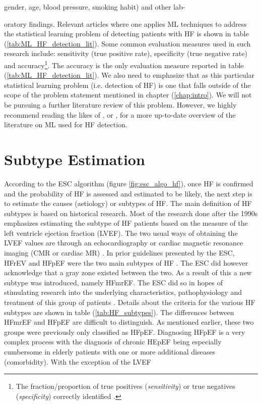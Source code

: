 \documentclass[../thesis.tex]{subfiles}
\begin{document}
gender, age, blood pressure, smoking habit) and other lab-



\noindent oratory findings. Relevant articles where one applies ML techniques to address the statistical learning problem of detecting patients with HF is shown in table (\ref{tab:ML_HF_detection_lit}). Some common evaluation measures used in such research include: sensitivity (true positive rate), specificity (true negative rate) and accuracy\footnote{The fraction/proportion of true positives (\textit{sensitivity}) or true negatives (\textit{specificity}) correctly identified \citep{james2013introduction}.}. The accuracy is the only evaluation measure reported in table (\ref{tab:ML_HF_detection_lit}). We also need to emphasize that as this particular statistical learning problem (i.e. detection of HF) is one that falls outside of the scope of the problem statement mentioned in chapter (\ref{chap:intro}). We will not be pursuing a further literature review of this problem. However, we highly recommend reading the likes of \cite{tripoliti2017heart}, \cite{acharya2017application} or \cite{awan2018machine}, for a more up-to-date overview of the literature on ML used for HF detection. 


\section{Subtype Estimation}
\label{sec:subtypeest}

\noindent According to the ESC algorithm (figure \ref{fig:esc_algo_hf}), once HF is confirmed and the probability of HF is assessed and estimated to be likely, the next step is to estimate the causes (aetiology) or subtypes of HF. The main definition of HF subtypes is based on historical research. Most of the research done after the 1990s emphasizes estimating the subtype of HF patients based on the measure of the left ventricle ejection fraction (LVEF). The two usual ways of obtaining the LVEF values are through an echocardiography or cardiac magnetic resonance imaging (CMR or cardiac MR) \citep{ponikowski2016}. In prior guidelines presented by the ESC, HFrEV and HFpEF were the two main subtypes of HF \citep{authors2012esc}. The ESC did however acknowledge that a gray zone existed between the two. As a result of this a new subtype was introduced, namely HFmrEF. The ESC did so in hopes of stimulating research into the underlying characteristics, pathophysiology and treatment of this group of patients \citep{ponikowski2016}. Details about the criteria for the various HF subtypes are shown in table (\ref{tab:HF_subtypes}). The differences between HFmrEF and HFpEF are difficult to distinguish. As mentioned earlier, these two groups were previously only classified as HFpEF. Diagnosing HFpEF is a very complex process with the diagnosis of chronic HEpEF being especially cumbersome in elderly patients with one or more additional diseases (comorbidity). With the exception of the LVEF 
\end{document}
